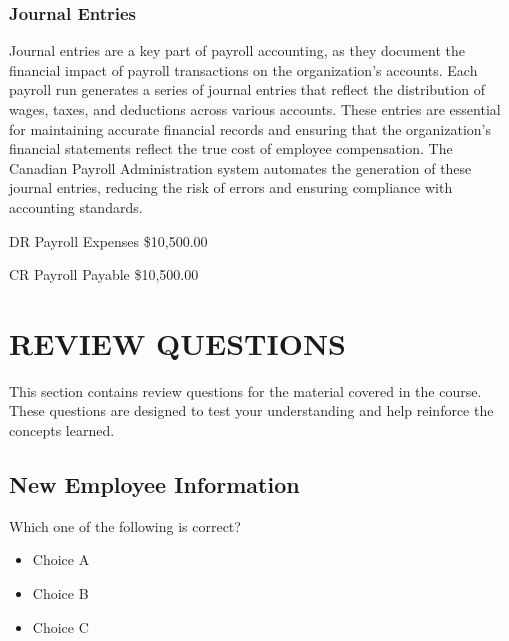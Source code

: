 \documentclass[letterpaper,10pt,english]{sphinxmanual}
\begin{document}
\subsection{Journal Entries}
\label{\detokenize{payroll_accounting:id1}}
\sphinxAtStartPar
Journal entries are a key part of payroll accounting, as they document the financial impact of payroll transactions on the organization’s accounts. Each payroll run generates a series of journal entries that reflect the distribution of wages, taxes, and deductions across various accounts.
These entries are essential for maintaining accurate financial records and ensuring that the organization’s financial statements reflect the true cost of employee compensation. The Canadian Payroll Administration system automates the generation of these journal entries, reducing the risk of errors and ensuring compliance with accounting standards.

\begin{DUlineblock}{0em}
\item[] DR    Payroll Expenses    \$10,500.00
\item[]
\begin{DUlineblock}{\DUlineblockindent}
\item[] CR  Payroll Payable   \$10,500.00
\end{DUlineblock}
\end{DUlineblock}

\sphinxstepscope


\chapter{REVIEW QUESTIONS}
\label{\detokenize{review_questions:review-questions}}\label{\detokenize{review_questions::doc}}
\sphinxAtStartPar
This section contains review questions for the material covered in the course. These questions are designed to test your understanding and help reinforce the concepts learned.


\section{New Employee Information}
\label{\detokenize{review_questions:new-employee-information}}
\sphinxAtStartPar
Which one of the following is correct?
\begin{itemize}
\item {} 
\sphinxAtStartPar
{} Choice A

\item {} 
\sphinxAtStartPar
{} Choice B

\item {} 
\sphinxAtStartPar
{} Choice C

\end{itemize}
\end{document}

